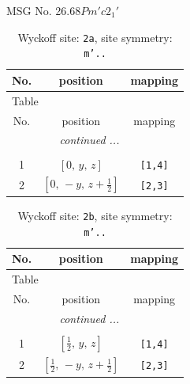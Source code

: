 \documentclass[fleqn,8pt]{jsarticle}
\begin{document}
\setcounter{MaxMatrixCols}{32}

\renewcommand{\tablename}{Table~}
\renewcommand{\figurename}{Figure~}
\begin{center}
\LARGE
MSG No. 26.68\quad$Pm'c2_{1}'$
\end{center}
\renewcommand{\arraystretch}{1.2}
\begin{longtable}{ccc}
\caption{Wyckoff site: {\tt 2a}, site symmetry: {\tt m'..}}
 \\
 \hline \hline
No. & position & mapping \\ \hline \endfirsthead

\multicolumn{2}{l}{\tablename\ \thetable{}} \\
 \hline \hline
No. & position & mapping \\ \hline \endhead

 \hline \hline
\multicolumn{2}{r}{\footnotesize\it continued ...} \\ \endfoot

 \hline \hline
\multicolumn{2}{r}{} \\ \endlastfoot

1 & $\left[ 0,\, y,\, z \right]$ & {\tt [1,4]} \\ \hline
2 & $\left[ 0,\, - y,\, z + \frac{1}{2} \right]$ & {\tt [2,3]} \\
\end{longtable}
\renewcommand{\arraystretch}{1.2}
\begin{longtable}{ccc}
\caption{Wyckoff site: {\tt 2b}, site symmetry: {\tt m'..}}
 \\
 \hline \hline
No. & position & mapping \\ \hline \endfirsthead

\multicolumn{2}{l}{\tablename\ \thetable{}} \\
 \hline \hline
No. & position & mapping \\ \hline \endhead

 \hline \hline
\multicolumn{2}{r}{\footnotesize\it continued ...} \\ \endfoot

 \hline \hline
\multicolumn{2}{r}{} \\ \endlastfoot

1 & $\left[ \frac{1}{2},\, y,\, z \right]$ & {\tt [1,4]} \\ \hline
2 & $\left[ \frac{1}{2},\, - y,\, z + \frac{1}{2} \right]$ & {\tt [2,3]} \\
\end{longtable}
\renewcommand{\arraystretch}{1.2}
\end{document}
